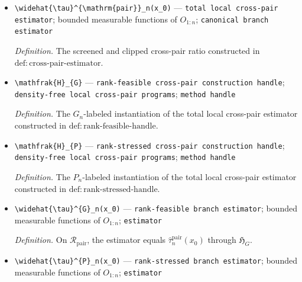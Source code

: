 \documentclass{article}
\begin{document}
\begin{itemize}
  \par\smallskip\noindent\emph{Definition.} The open reversed-nuisance-order set constructed in \(\mathrm{def:pair\mbox{-}regions}\).
  \item \texttt{\textbackslash{}\allowbreak{}widehat\{\textbackslash{}\allowbreak{}tau\}\allowbreak{}\textasciicircum{}\{\textbackslash{}\allowbreak{}mathrm\{pair\}\allowbreak{}\}\allowbreak{}\_\allowbreak{}n(x\_\allowbreak{}0)} --- \texttt{total local cross-\allowbreak{}pair estimator}; bounded measurable functions of \(O_{1:n}\); \texttt{canonical branch estimator}
  \par\smallskip\noindent\emph{Definition.} The screened and clipped cross-pair ratio constructed in \(\mathrm{def:cross\mbox{-}pair\mbox{-}estimator}\).
  \item \texttt{\textbackslash{}\allowbreak{}mathfrak\{H\}\allowbreak{}\_\allowbreak{}\{G\}\allowbreak{}} --- \texttt{rank-\allowbreak{}feasible cross-\allowbreak{}pair construction handle}; \texttt{density-\allowbreak{}free local cross-\allowbreak{}pair programs}; \texttt{method handle}
  \par\smallskip\noindent\emph{Definition.} The \(G_n\)-labeled instantiation of the total local cross-pair estimator constructed in \(\mathrm{def:rank\mbox{-}feasible\mbox{-}handle}\).
  \item \texttt{\textbackslash{}\allowbreak{}mathfrak\{H\}\allowbreak{}\_\allowbreak{}\{P\}\allowbreak{}} --- \texttt{rank-\allowbreak{}stressed cross-\allowbreak{}pair construction handle}; \texttt{density-\allowbreak{}free local cross-\allowbreak{}pair programs}; \texttt{method handle}
  \par\smallskip\noindent\emph{Definition.} The \(P_n\)-labeled instantiation of the total local cross-pair estimator constructed in \(\mathrm{def:rank\mbox{-}stressed\mbox{-}handle}\).
  \item \texttt{\textbackslash{}\allowbreak{}widehat\{\textbackslash{}\allowbreak{}tau\}\allowbreak{}\textasciicircum{}\{G\}\allowbreak{}\_\allowbreak{}n(x\_\allowbreak{}0)} --- \texttt{rank-\allowbreak{}feasible branch estimator}; bounded measurable functions of \(O_{1:n}\); \texttt{estimator}
  \par\smallskip\noindent\emph{Definition.} On \(\mathcal R_{\mathrm{pair}}\), the estimator equals \(\widehat\tau_n^{\mathrm{pair}}(x_0)\) through \(\mathfrak H_G\).
  \item \texttt{\textbackslash{}\allowbreak{}widehat\{\textbackslash{}\allowbreak{}tau\}\allowbreak{}\textasciicircum{}\{P\}\allowbreak{}\_\allowbreak{}n(x\_\allowbreak{}0)} --- \texttt{rank-\allowbreak{}stressed branch estimator}; bounded measurable functions of \(O_{1:n}\); \texttt{estimator}

\end{itemize}
\end{document}
